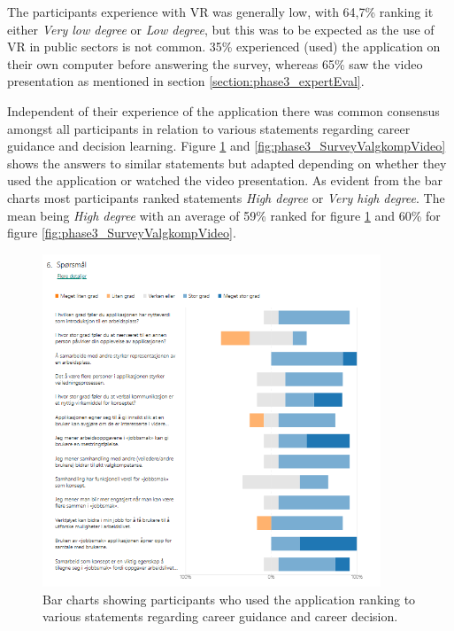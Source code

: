 The participants experience with VR was generally low, with 64,7\% ranking it either \textit{Very low degree} or \textit{Low degree}, but this was to be expected as the use of VR in public sectors is not common. 35\% experienced (used) the application on their own computer before answering the survey, whereas 65\% saw the video presentation as mentioned in section \ref{section:phase3_expertEval}.  



Independent of their experience of the application there was common consensus amongst all participants in relation to various statements regarding career guidance and decision learning. Figure \ref{fig:phase3_SurveyValgkompApp} and \ref{fig:phase3_SurveyValgkompVideo} shows the answers to similar statements but adapted depending on whether they used the application or watched the video presentation. As evident from the bar charts most participants ranked statements \textit{High degree} or \textit{Very high degree}. The mean being \textit{High degree} with an average of 59\% ranked for figure \ref{fig:phase3_SurveyValgkompApp} and 60\% for figure \ref{fig:phase3_SurveyValgkompVideo}.

\begin{figure}[H]
  \centering
   \captionsetup{width=.8\linewidth}
    \includegraphics[width=0.9\textwidth]{fig/phase_3/survey/valgKompentanseApp.PNG}
 \caption{Bar charts showing participants who used the application ranking to various statements regarding career guidance and career decision.}
\label{fig:phase3_SurveyValgkompApp}
\end{figure}


